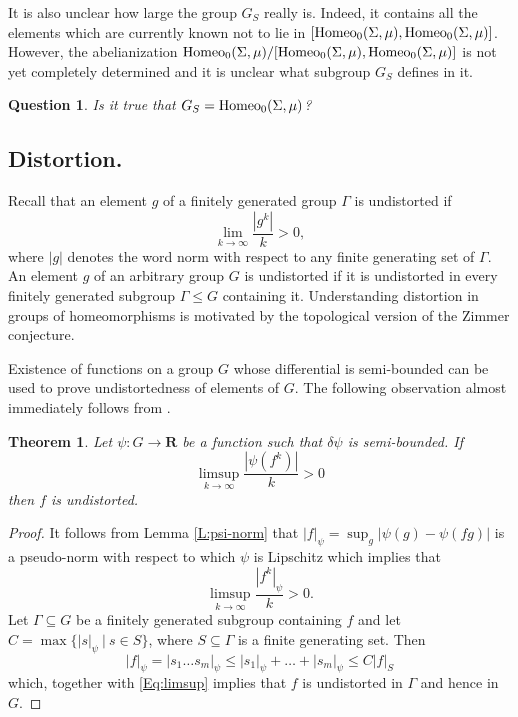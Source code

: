 \documentclass[11pt]{amsart}
\newtheorem{theorem}[subsection]{Theorem}%
\newtheorem{question}{Question}
\theoremstyle{definition}
\theoremstyle{remark}
\numberwithin{equation}{section}
\numberwithin{figure}{section}
\newcommand{\B}[1]{{\mathbf #1}}
\begin{document}
It is also unclear how large the group $G_S$ really is. Indeed, it contains all the elements which are currently known not to lie in $[{\rm Homeo}_0(\Sigma, \mu), {\rm Homeo}_0(\Sigma, \mu)]$. 
However, the abelianization ${\rm Homeo}_0(\Sigma, \mu)/[{\rm Homeo}_0(\Sigma, \mu), {\rm Homeo}_0(\Sigma, \mu)]$ is not yet completely determined and it is unclear what subgroup $G_S$ defines in it.

\begin{question}
Is it true that $G_S = {\rm Homeo}_0(\Sigma, \mu)$?   
\end{question}

\subsection*{Distortion.} 
Recall that an element $g$ of a finitely generated group
$\Gamma$ is undistorted if 
$$\lim_{k\to \infty}\frac{|g^k|}{k}>0,$$
where $|g|$ denotes the word norm with respect to any finite generating set of $\Gamma$.
An element $g$ of an arbitrary group $G$ is undistorted if it is undistorted in every
finitely generated subgroup $\Gamma\leq G$ containing it. Understanding distortion
in groups of homeomorphisms is motivated by the topological version of the Zimmer
conjecture. 

Existence of functions on a group $G$ whose differential
is semi-bounded can be used to prove undistortedness of elements of $G$.
The following observation almost immediately follows from
\cite[Proposition 4.2]{arXiv:2208.03168}.

\begin{theorem}\label{T:distortion}
Let $\psi \colon G\to \B R$ be a function such that $\delta\psi$ is semi-bounded.
If 
$$
\limsup_{k\to \infty}\frac{|\psi(f^k)|}{k}>0
$$ 
then $f$ is undistorted.
\end{theorem}

\begin{proof}
It follows from Lemma \ref{L:psi-norm} that $|f|_{\psi}=\sup_g|\psi(g)-\psi(fg)|$ 
is a pseudo-norm with respect to which
$\psi$ is Lipschitz which implies that 
\begin{equation}
\limsup_{k\to \infty} \frac{|f^k|_{\psi}}{k}>0.
\label{Eq:limsup}
\end{equation}
Let
$\Gamma\subseteq G$ be a finitely generated subgroup containing $f$
and let $C=\max\{|s|_{\psi}\ |\ s\in S\}$, 
where $S\subseteq \Gamma$ is a finite generating set. Then
$$
|f|_{\psi} = |s_1\dots s_m|_{\psi} \leq |s_1|_{\psi} + \dots + |s_m|_{\psi}
\leq C |f|_S
$$
which, together with \eqref{Eq:limsup} implies that $f$ is undistorted in $\Gamma$
and hence in $G$.
\end{proof}
\end{document}
